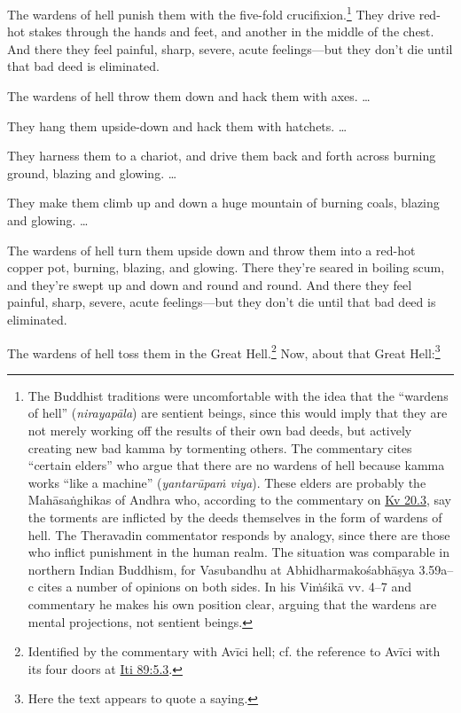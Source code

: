 \documentclass[12pt,openany]{book}%
\begin{document}
The wardens of hell punish them with the five-fold crucifixion.\footnote{The Buddhist traditions were uncomfortable with the idea that the “wardens of hell” (\textit{\textsanskrit{nirayapāla}}) are sentient beings, since this would imply that they are not merely working off the results of their own bad deeds, but actively creating new bad kamma by tormenting others. The commentary cites “certain elders” who argue that there are no wardens of hell because kamma works “like a machine” (\textit{\textsanskrit{yantarūpaṁ} viya}). These elders are probably the \textsanskrit{Mahāsaṅghikas} of Andhra who, according to the commentary on \href{https://suttacentral.net/kv20.3/en/sujato}{Kv 20.3}, say the torments are inflicted by the deeds themselves in the form of wardens of hell. The Theravadin commentator responds by analogy, since there are those who inflict punishment in the human realm. The situation was comparable in northern Indian Buddhism, for Vasubandhu at \textsanskrit{Abhidharmakośabhāṣya} 3.59a–c cites a number of opinions on both sides. In his \textsanskrit{Viṁśikā} vv. 4–7 and commentary he makes his own position clear, arguing that the wardens are mental projections, not sentient beings. } They drive red-hot stakes through the hands and feet, and another in the middle of the chest. And there they feel painful, sharp, severe, acute feelings—but they don’t die until that bad deed is eliminated. 

The wardens of hell throw them down and hack them with axes. … 

They hang them upside-down and hack them with hatchets. … 

They harness them to a chariot, and drive them back and forth across burning ground, blazing and glowing. … 

They make them climb up and down a huge mountain of burning coals, blazing and glowing. … 

The wardens of hell turn them upside down and throw them into a red-hot copper pot, burning, blazing, and glowing. There they’re seared in boiling scum, and they’re swept up and down and round and round. And there they feel painful, sharp, severe, acute feelings—but they don’t die until that bad deed is eliminated. 

The wardens of hell toss them in the Great Hell.\footnote{Identified by the commentary with \textsanskrit{Avīci} hell; cf. the reference to \textsanskrit{Avīci} with its four doors at \href{https://suttacentral.net/iti89/en/sujato\#5.3}{Iti 89:5.3}. } Now, about that Great Hell:\footnote{Here the text appears to quote a saying. } 
\end{document}
